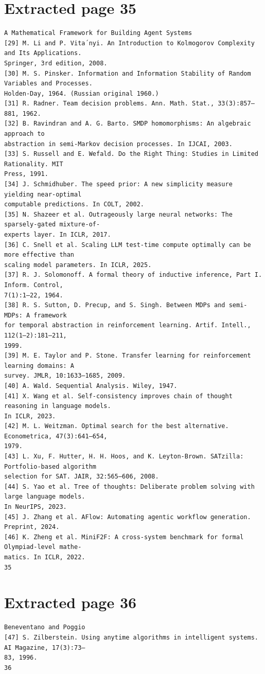 \documentclass[11pt]{article}
\begin{document}
\section*{Extracted page 35}
\begin{verbatim}
A Mathematical Framework for Building Agent Systems
[29] M. Li and P. Vita´nyi. An Introduction to Kolmogorov Complexity and Its Applications.
Springer, 3rd edition, 2008.
[30] M. S. Pinsker. Information and Information Stability of Random Variables and Processes.
Holden-Day, 1964. (Russian original 1960.)
[31] R. Radner. Team decision problems. Ann. Math. Stat., 33(3):857–881, 1962.
[32] B. Ravindran and A. G. Barto. SMDP homomorphisms: An algebraic approach to
abstraction in semi-Markov decision processes. In IJCAI, 2003.
[33] S. Russell and E. Wefald. Do the Right Thing: Studies in Limited Rationality. MIT
Press, 1991.
[34] J. Schmidhuber. The speed prior: A new simplicity measure yielding near-optimal
computable predictions. In COLT, 2002.
[35] N. Shazeer et al. Outrageously large neural networks: The sparsely-gated mixture-of-
experts layer. In ICLR, 2017.
[36] C. Snell et al. Scaling LLM test-time compute optimally can be more effective than
scaling model parameters. In ICLR, 2025.
[37] R. J. Solomonoff. A formal theory of inductive inference, Part I. Inform. Control,
7(1):1–22, 1964.
[38] R. S. Sutton, D. Precup, and S. Singh. Between MDPs and semi-MDPs: A framework
for temporal abstraction in reinforcement learning. Artif. Intell., 112(1–2):181–211,
1999.
[39] M. E. Taylor and P. Stone. Transfer learning for reinforcement learning domains: A
survey. JMLR, 10:1633–1685, 2009.
[40] A. Wald. Sequential Analysis. Wiley, 1947.
[41] X. Wang et al. Self-consistency improves chain of thought reasoning in language models.
In ICLR, 2023.
[42] M. L. Weitzman. Optimal search for the best alternative. Econometrica, 47(3):641–654,
1979.
[43] L. Xu, F. Hutter, H. H. Hoos, and K. Leyton-Brown. SATzilla: Portfolio-based algorithm
selection for SAT. JAIR, 32:565–606, 2008.
[44] S. Yao et al. Tree of thoughts: Deliberate problem solving with large language models.
In NeurIPS, 2023.
[45] J. Zhang et al. AFlow: Automating agentic workflow generation. Preprint, 2024.
[46] K. Zheng et al. MiniF2F: A cross-system benchmark for formal Olympiad-level mathe-
matics. In ICLR, 2022.
35
\end{verbatim}

\clearpage
\section*{Extracted page 36}
\begin{verbatim}
Beneventano and Poggio
[47] S. Zilberstein. Using anytime algorithms in intelligent systems. AI Magazine, 17(3):73–
83, 1996.
36
\end{verbatim}
\end{document}
